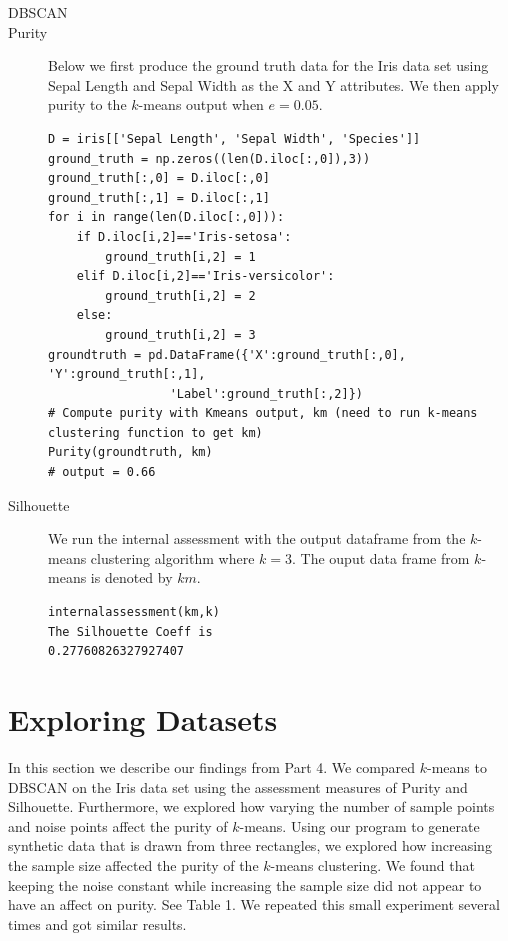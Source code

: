 \documentclass[psamsfonts,onesided,10pt]{amsart}
\begin{document}
\begin{description}
\item[DBSCAN] \todo{}
\item[Purity] Below we first produce the ground truth data for the Iris data set using Sepal Length 
and Sepal Width as the X and Y attributes. We then apply purity to the $k$-means output when $e=0.05$. 
\begin{verbatim}
D = iris[['Sepal Length', 'Sepal Width', 'Species']]
ground_truth = np.zeros((len(D.iloc[:,0]),3))
ground_truth[:,0] = D.iloc[:,0]
ground_truth[:,1] = D.iloc[:,1]
for i in range(len(D.iloc[:,0])):
    if D.iloc[i,2]=='Iris-setosa':
        ground_truth[i,2] = 1
    elif D.iloc[i,2]=='Iris-versicolor':
        ground_truth[i,2] = 2
    else:
        ground_truth[i,2] = 3
groundtruth = pd.DataFrame({'X':ground_truth[:,0], 'Y':ground_truth[:,1], 
                 'Label':ground_truth[:,2]})       
# Compute purity with Kmeans output, km (need to run k-means clustering function to get km)
Purity(groundtruth, km)
# output = 0.66
\end{verbatim}
\item[Silhouette] We run the internal assessment with the output dataframe from the 
$k$-means clustering algorithm where $k=3$. The ouput data frame from $k$-means is denoted by $km$.
\begin{verbatim}
internalassessment(km,k)
The Silhouette Coeff is 
0.27760826327927407
\end{verbatim}
\end{description}

\section{Exploring Datasets}
In this section we describe our findings from Part 4. We compared $k$-means to DBSCAN on the 
Iris data set using the assessment measures of Purity and Silhouette. Furthermore, we explored 
how varying the number of sample points and noise points affect the purity of $k$-means. 
Using our program to generate synthetic data that is drawn from three rectangles, we explored 
how increasing the sample size affected the purity of the $k$-means clustering. We found that 
keeping the noise constant while increasing the sample size did not appear to have an affect on 
purity. See Table 1. We repeated this small experiment several times and got similar results. 
\end{document}
